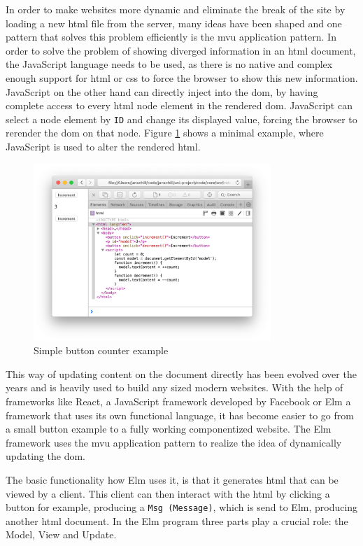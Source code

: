 In order to make websites more dynamic and eliminate the break of the site by loading a new \gls{html} file from the server, many ideas have been shaped and one pattern that solves this problem efficiently is the \gls{mvu} application pattern.
In order to solve the problem of showing diverged information in an \gls{html} document, the JavaScript language needs to be used, as there is no native and complex enough support for \gls{html} or \gls{css} to force the browser to show this new information. JavaScript on the other hand can directly inject into the \gls{dom}, by having complete access to every \gls{html} node element in the rendered \gls{dom}.
JavaScript can select a node element by \texttt{ID} and change its displayed value, forcing the browser to rerender the \gls{dom} on that node. Figure \ref{fig:button_browser} shows a minimal example, where JavaScript is used to alter the rendered \gls{html}.

\begin{figure}
    \centering
    \includegraphics[width=0.8\textwidth]{images/button-browser.png}
    \caption{Simple button counter example}
    \label{fig:button_browser}
\end{figure}

This way of updating content on the document directly has been evolved over the years and is heavily used to build any sized modern websites. With the help of frameworks like React, a JavaScript framework developed by Facebook or Elm a framework that uses its own functional language, it has become easier to go from a small button example to a fully working componentized website.
The Elm framework uses the \gls{mvu} application pattern to realize the idea of dynamically updating the \gls{dom}.

The basic functionality how Elm uses it, is that it generates \gls{html} that can be viewed by a client. This client can then interact with the \gls{html} by clicking a button for example, producing a \texttt{Msg (Message)}, which is send to Elm, producing another \gls{html} document.
In the Elm program three parts play a crucial role: the Model, View and Update.

